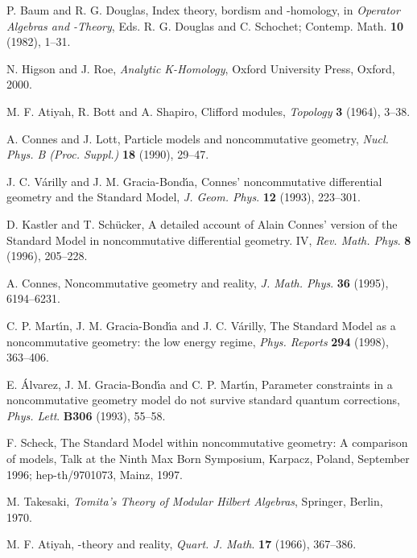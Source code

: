 \documentclass[a4paper,12pt]{article}
\providecommand{\1}{\mathbf{1}}         %
\providecommand{\7}{\dagger}            %
\providecommand{\8}{\bullet}            %
\renewcommand{\.}{\cdot}            %
\renewcommand{\:}{\colon}           %
\begin{document}
\begin{thebibliography}{74}
P. Baum and R. G. Douglas,
Index theory, bordism and \coordHE{}-homology,
in \textit{Operator Algebras and \coordHE{}-Theory},
Eds. R. G. Douglas and C. Schochet;
Contemp. Math. {\bf 10} (1982), 1--31.

N. Higson and J. Roe,
\textit{Analytic K-Homology},
Oxford University Press, Oxford, 2000.

M. F. Atiyah, R. Bott and A. Shapiro,
Clifford modules,
\textit{Topology} {\bf 3} (1964), 3--38.

A. Connes and J. Lott,
Particle models and noncommutative geometry,
\textit{Nucl. Phys. B (Proc. Suppl.)} {\bf 18} (1990), 29--47.

J. C. V\'arilly and J. M. Gracia-Bond\'{\i}a,
Connes' noncommutative differential geometry and the
Standard Model,
\textit{J. Geom. Phys}. {\bf 12} (1993), 223--301.

D. Kastler and T. Sch\"ucker,
A detailed account of Alain Connes' version of the Standard Model
in noncommutative differential geometry. IV,
\textit{Rev. Math. Phys}. {\bf 8} (1996), 205--228.

A. Connes,
Noncommutative geometry and reality,
\textit{J. Math. Phys}. {\bf 36} (1995), 6194--6231.

C. P. Mart\'{\i}n, J. M. Gracia-Bond\'{\i}a and J. C. V\'arilly,
The Standard Model as a noncommutative geometry: the low energy
regime,
\textit{Phys. Reports} {\bf 294} (1998), 363--406.

E. \'Alvarez, J. M. Gracia-Bond\'{\i}a and C. P. Mart\'{\i}n,
Parameter constraints in a noncommutative geometry model do not
survive standard quantum corrections,
\textit{Phys. Lett}. {\bf B306} (1993), 55--58.

F. Scheck,
The Standard Model within noncommutative geometry: A comparison of
models,
Talk at the Ninth Max Born Symposium, Karpacz, Poland, September 1996;
hep-th/9701073, Mainz, 1997.

M. Takesaki,
\textit{Tomita's Theory of Modular Hilbert Algebras},
Springer, Berlin, 1970.

M. F. Atiyah,
\coordHE{}-theory and reality,
\textit{Quart. J. Math}. {\bf 17} (1966), 367--386.


\end{thebibliography}
\end{document}
